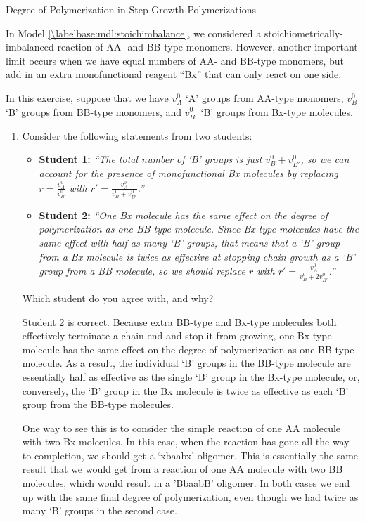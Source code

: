 \begin{activity}{Degree of Polymerization in Step-Growth Polymerizations}
\begin{exercises}
\begin{enumerate}
			\end{enumerate}
		
		\exercise In Model \ref{\labelbase:mdl:stoichimbalance}, we considered a stoichiometrically-imbalanced reaction of AA- and BB-type monomers.  However, another important limit occurs when we have equal numbers of AA- and BB-type monomers, but add in an extra monofunctional reagent ``Bx'' that can only react on one side.
		
			In this exercise, suppose that we have $v_A^0$ `A' groups from AA-type monomers, $v_B^0$ `B' groups from BB-type monomers, and $v_{B'}^0$ `B' groups from Bx-type molecules.
		
			\begin{enumerate}
				\item Consider the following statements from two students:
					
					\begin{itemize}
				
					\item \textbf{Student 1:} \emph{``The total number of `B' groups is just $v_B^0 + v_{B'}^0$, so we can account for the presence of monofunctional Bx molecules by replacing $r=\frac{v_A^0}{v_B^0}$ with $r'=\frac{v_A^0}{v_B^0 + v_{B'}^0}$.''}
					
					\item \textbf{Student 2:} \emph{``One Bx molecule has the same effect on the degree of polymerization as one BB-type molecule.  Since Bx-type molecules have the same effect with half as many `B' groups, that means that a `B' group from a Bx molecule is twice as effective at stopping chain growth as a `B' group from a BB molecule, so we should replace $r$ with $r'=\frac{v_A^0}{v_B^0 + 2v_{B'}^0}$.''}
					\end{itemize}
					
					Which student do you agree with, and why?
				
					\begin{solution}{}
						Student 2 is correct.  Because extra BB-type and Bx-type molecules both effectively terminate a chain end and stop it from growing, one Bx-type molecule has the same effect on the degree of polymerization as one BB-type molecule.  As a result, the individual `B' groups in the BB-type molecule are essentially half as effective as the single `B' group in the Bx-type molecule, or, conversely, the `B' group in the Bx molecule is twice as effective as each `B' group from the BB-type molecules.
						
						One way to see this is to consider the simple reaction of one AA molecule with two Bx molecules.  In this case, when the reaction has gone all the way to completion, we should get a `xbaabx' oligomer.  This is essentially the same result that we would get from a reaction of one AA molecule with two BB molecules, which would result in a 'BbaabB' oligomer.  In both cases we end up with the same final degree of polymerization, even though we had twice as many `B' groups in the second case.
						

\end{solution}
\end{enumerate}
\end{exercises}
\end{activity}
